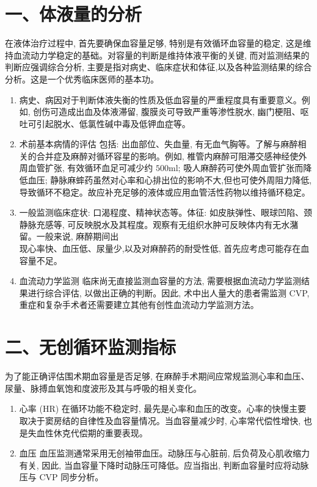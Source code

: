 \documentclass[10pt]{article}
\begin{document}
\section*{一、体液量的分析}
在液体治疗过程中, 首先要确保血容量足够, 特别是有效循环血容量的稳定, 这是维持血流动力学稳定的基础。对容量的判断是维持体液平衡的关键, 而对监测结果的判断应强调综合分析, 主要是指对病史、临床症状和体征,以及各种监测结果的综合分析。这是一个优秀临床医师的基本功。

\begin{enumerate}
  \item 病史、病因对于判断体液失衡的性质及低血容量的严重程度具有重要意义。例如, 创伤可造成出血及体液滞留, 腹膜炎可导致严重等渗性脱水, 幽门梗阻、呕吐可引起脱水、低氯性碱中毒及低钾血症等。

  \item 术前基本病情的评估 包括: 出血部位、失血量, 有无血气胸等。了解与麻醉相关的合并症及麻醉对循环容星的影响。例如, 椎管内麻醉可阻滞交感神经使外周血管扩张, 有效循环血足可减少约 $500 \mathrm{ml}$; 吸人麻醉药可使外周血管扩张而降低血压; 静脉麻蟀药虽然对心率和心排出位的影响不大,但也可使外周阻力降低,导致循环不稳定。故应补充足够的液体或应用血管活性药物以维持循环稳定。

  \item 一般监测临床症状: 口渴程度、精神状态等。体征: 如皮肤弹性、眼球凹陷、颈静脉充感等, 可反映脱水及其程度。观察有无组织水肿可反映体内有无水潴留。一般来说, 麻醉期间出\\
现心率快、血压低、尿量少,以及对麻醉药的耐受性低, 首先应考虑可能存在血容量不足。

  \item 血流动力学监测 临床尚无直接监测血容量的方法, 需要根据血流动力学监测结果进行综合评估, 以做出正确的判断。因此, 术中出人量大的患者需监测 CVP, 重症和复杂手术者还需要建立其他有创性血流动力学监测方法。

\end{enumerate}

\section*{二、无创循环监测指标}
为了能正确评估围术期血容量是否足够, 在麻醉手术期间应常规监测心率和血压、尿量、脉搏血氧饱和度波形及其与呼吸的相关变化。

\begin{enumerate}
  \item 心率 (HR) 在循环功能不稳定时, 最先是心率和血压的改变。心率的快慢主要取决于窦房结的自律性及血容量情况。当血容量减少时, 心率常代偿性增快, 也是失血性休克代偿期的重要表现。

  \item 血压 血压监测通常采用无创袖带血压。动脉压与心脏前, 后负荷及心肌收缩力有关, 因此, 当血容量下降时动脉压可降低。应当指出, 判断血容量时应将动脉压与 CVP 同步分析。

\end{enumerate}
\end{document}
